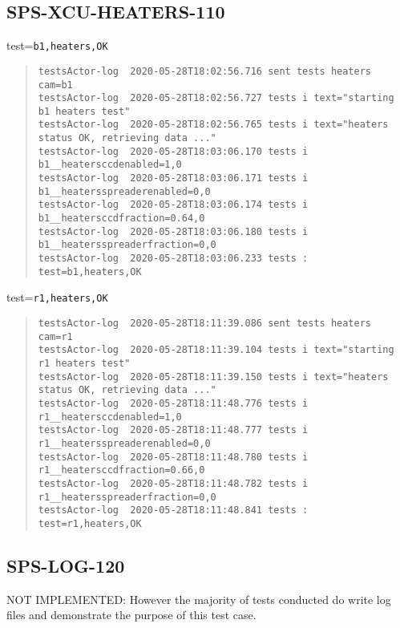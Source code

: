 \subsection{SPS-XCU-HEATERS-110}
\label{sec:tc-110}

test=\texttt{b1,heaters,OK}

\begin{quote}
\begin{tiny}
\begin{verbatim}
testsActor-log  2020-05-28T18:02:56.716 sent tests heaters cam=b1
testsActor-log  2020-05-28T18:02:56.727 tests i text="starting b1 heaters test"
testsActor-log  2020-05-28T18:02:56.765 tests i text="heaters status OK, retrieving data ..."
testsActor-log  2020-05-28T18:03:06.170 tests i b1__heatersccdenabled=1,0
testsActor-log  2020-05-28T18:03:06.171 tests i b1__heatersspreaderenabled=0,0
testsActor-log  2020-05-28T18:03:06.174 tests i b1__heatersccdfraction=0.64,0
testsActor-log  2020-05-28T18:03:06.180 tests i b1__heatersspreaderfraction=0,0
testsActor-log  2020-05-28T18:03:06.233 tests : test=b1,heaters,OK
\end{verbatim}
\end{tiny}
\end{quote}

\noindent test=\texttt{r1,heaters,OK}

\begin{quote}
\begin{tiny}
\begin{verbatim}
testsActor-log  2020-05-28T18:11:39.086 sent tests heaters cam=r1
testsActor-log  2020-05-28T18:11:39.104 tests i text="starting r1 heaters test"
testsActor-log  2020-05-28T18:11:39.150 tests i text="heaters status OK, retrieving data ..."
testsActor-log  2020-05-28T18:11:48.776 tests i r1__heatersccdenabled=1,0
testsActor-log  2020-05-28T18:11:48.777 tests i r1__heatersspreaderenabled=0,0
testsActor-log  2020-05-28T18:11:48.780 tests i r1__heatersccdfraction=0.66,0
testsActor-log  2020-05-28T18:11:48.782 tests i r1__heatersspreaderfraction=0,0
testsActor-log  2020-05-28T18:11:48.841 tests : test=r1,heaters,OK
\end{verbatim}
\end{tiny}
\end{quote}

\subsection{SPS-LOG-120}
\label{sec:tc-120}
NOT IMPLEMENTED: However the majority of tests conducted do write log files and demonstrate the purpose
of this test case. 

